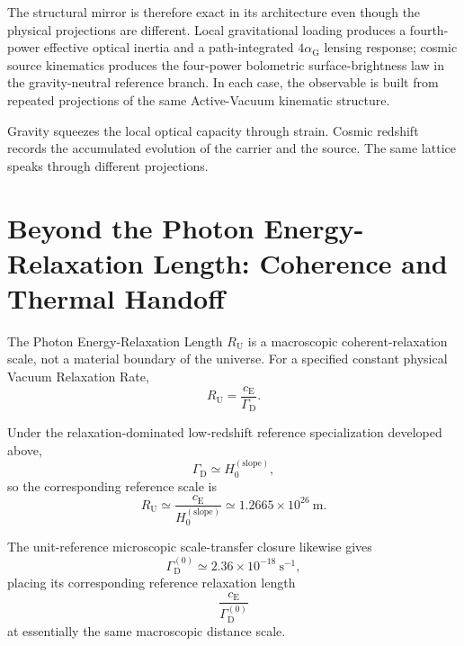 The structural mirror is therefore exact in its architecture even though the physical projections are different. Local gravitational loading produces a fourth-power effective optical inertia and a path-integrated $4\alpha_{\mathrm G}$ lensing response; cosmic source kinematics produces the four-power bolometric surface-brightness law in the gravity-neutral reference branch. In each case, the observable is built from repeated projections of the same Active-Vacuum kinematic structure.

Gravity squeezes the local optical capacity through strain. Cosmic redshift records the accumulated evolution of the carrier and the source. The same lattice speaks through different projections.


\section{Beyond the Photon Energy-Relaxation Length: Coherence and Thermal Handoff}

The Photon Energy-Relaxation Length $R_{\mathrm U}$ is a macroscopic coherent-relaxation scale, not a material boundary of the universe. For a specified constant physical Vacuum Relaxation Rate,
\begin{equation}
    R_{\mathrm U}
    =
    \frac{c_{\mathrm E}}{\Gamma_{\mathrm D}}.
\end{equation}

Under the relaxation-dominated low-redshift reference specialization developed above,
\begin{equation}
    \Gamma_{\mathrm D}
    \simeq
    H_0^{(\mathrm{slope})},
\end{equation}
so the corresponding reference scale is
\begin{equation}
    R_{\mathrm U}
    \simeq
    \frac{c_{\mathrm E}}
    {H_0^{(\mathrm{slope})}}
    \simeq
    1.2665\times10^{26}\ \mathrm{m}.
\end{equation}

The unit-reference microscopic scale-transfer closure likewise gives
\begin{equation}
    \Gamma_{\mathrm D}^{(0)}
    \simeq
    2.36\times10^{-18}\ \mathrm{s}^{-1},
\end{equation}
placing its corresponding reference relaxation length
\begin{equation}
    \frac{c_{\mathrm E}}
    {\Gamma_{\mathrm D}^{(0)}}
\end{equation}
at essentially the same macroscopic distance scale.

